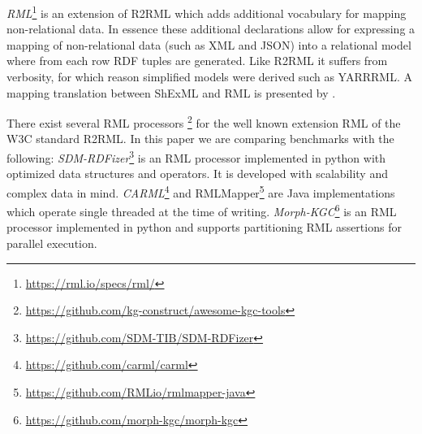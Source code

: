 \emph{RML}\footnote{\url{https://rml.io/specs/rml/}} is an extension of R2RML which adds additional vocabulary for mapping non-relational data\citep{Dimou2014, Dimou2020}. In essence these additional declarations allow for expressing a mapping of non-relational data (such as XML and JSON) into a relational model where from each row RDF tuples are generated. Like R2RML it suffers from verbosity, for which reason simplified models were derived such as YARRRML\cite{heyvaert2018declarativeyarrrml}.
A mapping translation between ShExML\cite{GarciaGonzalez2021} and RML is presented by \cite{GarciaGonzalez2022}.

There exist several RML processors \cite{ArenasGuerrero2021, Iglesias2023}\footnote{\url{https://github.com/kg-construct/awesome-kgc-tools}} for the well known extension RML of the W3C standard R2RML. 
In this paper we are comparing benchmarks with the following: %
\emph{SDM-RDFizer}\footnote{\url{https://github.com/SDM-TIB/SDM-RDFizer}} is an RML processor implemented in python with optimized data structures and operators. It is developed with scalability and complex data in mind\cite{Iglesias2020}.
\emph{CARML}\footnote{\url{https://github.com/carml/carml}} and RMLMapper\footnote{\url{https://github.com/RMLio/rmlmapper-java}} are Java implementations which operate single threaded at the time of writing.
\emph{Morph-KGC}\footnote{\url{https://github.com/morph-kgc/morph-kgc}} is an RML processor implemented in python and supports partitioning RML assertions\cite{arenas2022morphkgc} for parallel execution.




